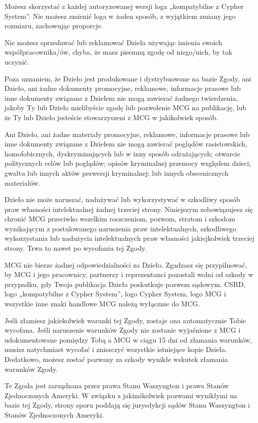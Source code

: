Możesz skorzystać z każdej autoryzowanej wersji loga „kompatybilne z Cypher System”. Nie możesz zmienić loga w żaden sposób, z wyjątkiem zmiany jego rozmiaru, zachowując proporcje. 

Nie możesz sprzedawać lub reklamować Dzieła używając imienia swoich współpracownika/ów, chyba, że masz pisemną zgodę od niego/nich, by tak uczynić.

Poza uznaniem, że Dzieło jest produkowane i dystrybuowane na bazie Zgody, ani Dzieło, ani żadne dokumenty promocyjne, reklamowe, informacje prasowe lub inne dokumenty związane z Dziełem nie mogą zawierać żadnego twierdzenia, jakoby Ty lub Dzieło mielibyście zgodę lub pozwolenie MCG na publikację, lub że Ty lub Dzieło jesteście stowarzyszeni z MCG w jakikolwiek sposób.

Ani Dzieło, ani żadne materiały promocyjne, reklamowe, informacje prasowe lub inne dokumenty związane z Dziełem nie mogą zawierać poglądów rasistowskich, homofobicznych, dyskryminujących lub w inny sposób odrażających; otwarcie politycznych celów lub poglądów; opisów kryminalnej przemocy względem dzieci; gwałtu lub innych aktów perwersji kryminalnej; lub innych obscenicznych materiałów.

Dzieło nie może naruszać, nadużywać lub wykorzystywać w szkodliwy sposób praw własności intelektualnej żadnej trzeciej strony. Niniejszym zobowiązujesz się chronić MCG przeciwko wszelkim roszczeniom, pozwom, stratom i szkodom wynikającym z postulowanego naruszenia praw intelektualnych, szkodliwego wykorzystania lub nadużycia intelektualnych praw własności jakiejkolwiek trzeciej strony. Trwa to nawet po wycofaniu tej Zgody.

MCG nie bierze żadnej odpowiedzialności za Dzieło. Zgadzasz się przypilnować, by MCG i jego pracownicy, partnerzy i reprezentanci pozostali wolni od szkody w przypadku, gdy Twoja publikacja Dzieła poskutkuje pozwem sądowym.
CSRD, logo „kompatybilne z Cypher System”, logo Cypher System, logo MCG i wszystkie inne znaki handlowe MCG należą wyłącznie do MCG.

Jeśli złamiesz jakiekolwiek warunki tej Zgody, zostaje ona automatycznie Tobie wycofana. Jeśli naruszenie warunków Zgody nie zostanie wyjaśnione z MCG i udokumentowane pomiędzy Tobą a MCG w ciągu 15 dni od złamania warunków, musisz natychmiast wycofać i zniszczyć wszystkie istniejące kopie Dzieła. Dodatkowo, możesz zostać pozwany za szkody wynikłe wskutek złamania warunków Zgody.

Te Zgoda jest zarządzana przez prawa Stanu Waszyngton i prawa Stanów Zjednoczonych Ameryki. W związku z jakimikolwiek pozwami wynikłymi na bazie tej Zgody, strony sporu poddają się jurysdykcji sądów Stanu Waszyngton i Stanów Zjednoczonych Ameryki.

